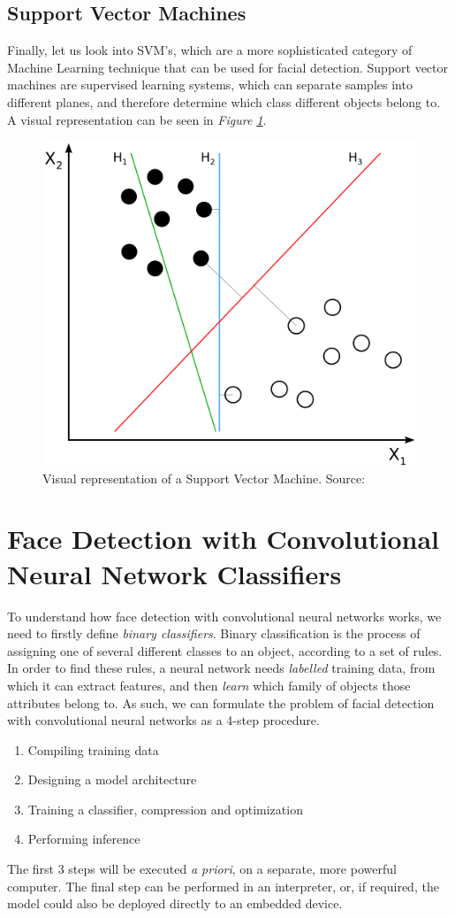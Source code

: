 \subsection{Support Vector Machines}
Finally, let us look into SVM's, which are a more sophisticated category of Machine Learning technique that can be used for facial detection. Support vector machines are supervised learning systems, which can separate samples into different planes, and therefore determine which class different objects belong to. A visual representation can be seen in \textit{Figure \ref{fig:svm}}. \cite{svm}
\begin{figure}
    \centering
    \includegraphics[width = 10 cm]{images/Svm_separating_hyperplanes_(SVG).svg.png}
    \caption{Visual representation of a Support Vector Machine. Source: \cite{svm_pic}}
    \label{fig:svm}
\end{figure}

\section{Face Detection with Convolutional Neural Network Classifiers}
To understand how face detection with convolutional neural networks works, we need to firstly define \textit{binary classifiers}. Binary classification is the process of assigning one of several different classes to an object, according to a set of rules. In order to find these rules, a neural network needs \textit{labelled} training data, from which it can extract features, and then \textit{learn} which family of objects those attributes belong to. As such, we can formulate the problem of facial detection with convolutional neural networks as a 4-step procedure.
\begin{enumerate}
    \item Compiling training data
    \item Designing a model architecture
    \item Training a classifier, compression and optimization
    \item Performing inference
\end{enumerate}
The first 3 steps will be executed \textit{a priori}, on a separate, more powerful computer. The final step can be performed in an interpreter, or, if required, the model could also be deployed directly to an embedded device.

